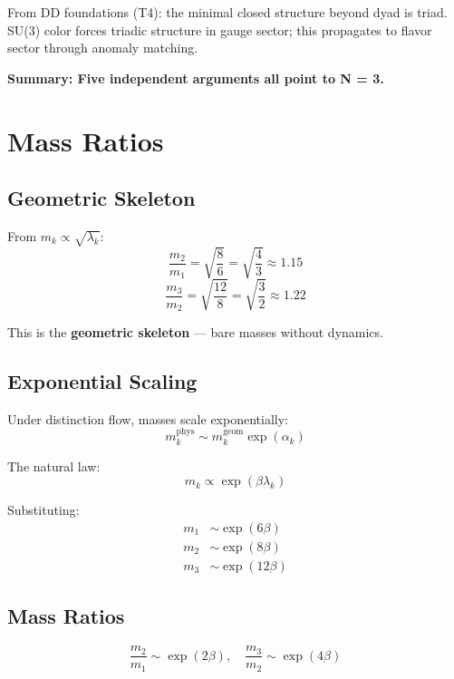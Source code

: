 From DD foundations (T4): the minimal closed structure beyond dyad is triad. SU(3) color forces triadic structure in gauge sector; this propagates to flavor sector through anomaly matching.

\textbf{Summary: Five independent arguments all point to N = 3.}

\section{Mass Ratios}

\subsection{Geometric Skeleton}

From $m_k \propto \sqrt{\lambda_k}$:
\begin{equation}
\frac{m_2}{m_1} = \sqrt{\frac{8}{6}} = \sqrt{\frac{4}{3}} \approx 1.15
\end{equation}
\begin{equation}
\frac{m_3}{m_2} = \sqrt{\frac{12}{8}} = \sqrt{\frac{3}{2}} \approx 1.22
\end{equation}

This is the \textbf{geometric skeleton} — bare masses without dynamics.

\subsection{Exponential Scaling}

Under distinction flow, masses scale exponentially:
\begin{equation}
m_k^{\text{phys}} \sim m_k^{\text{geom}} \exp(\alpha_k)
\end{equation}

The natural law:
\begin{equation}
m_k \propto \exp(\beta\lambda_k)
\end{equation}

Substituting:
\begin{align}
m_1 &\sim \exp(6\beta) \\
m_2 &\sim \exp(8\beta) \\
m_3 &\sim \exp(12\beta)
\end{align}

\subsection{Mass Ratios}

\begin{equation}
\frac{m_2}{m_1} \sim \exp(2\beta), \quad \frac{m_3}{m_2} \sim \exp(4\beta)
\end{equation}

